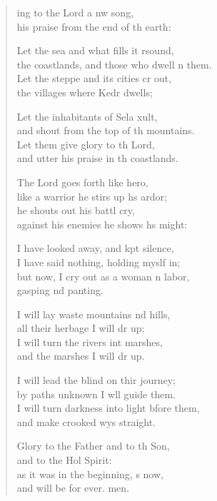 \begin{verse}
  \begin{patverse}
ing to the Lord a nw song,\Med\\
his praise from the end of th earth:

Let the sea and what fills it rsound,\Med\\
the coastlands, and those who dwell \pointup{\i}n them.\\
Let the steppe and its cities cr out,\Med\\
the villages where Kedr dwells;

Let the inhabitants of Sela xult,\Med\\
and shout from the top of th mountains.\\
Let them give glory to th Lord,\Med\\
and utter his praise in th coastlands.

The Lord goes forth like  hero,\Med\\
like a warrior he stirs up h\pointup{\i}s ardor;\\
he shouts out his battl cry,\Med\\
against his enemies he shows h\pointup{\i}s might:

I have looked away, and kpt silence,\Med\\
I have said nothing, holding myslf in;\\
but now, I cry out as a woman \pointup{\i}n labor,\Med\\
gasping nd panting.

I will lay waste mountains nd hills,\Med\\
all their herbage I will dr up;\\
I will turn the rivers int marshes,\Med\\
and the marshes I will dr up.

I will lead the blind on thir journey;\Med\\
by paths unknown I w\pointup{\i}ll guide them.\\
I will turn darkness into light bfore them,\Med\\
and make crooked wys straight.

Glory to the Father and to th Son,\Med\\
    and to the Hol Spirit:\\
as it was in the beginning, \pointup{\i}s now,\Med\\
    and will be for ever. men.
  \end{patverse}
\end{verse}

